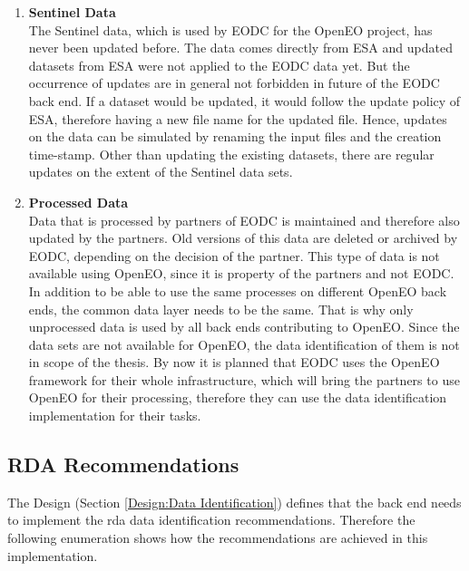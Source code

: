 \documentclass[draft,final]{vutinfth} %
\begin{document}
\begin{enumerate}
	\item \textbf{Sentinel Data} \\
	The Sentinel data, which is used by EODC for the OpenEO project, has never been updated before. The data comes directly from ESA and updated datasets from ESA were not applied to the EODC data yet. But the occurrence of updates are in general not forbidden in future of the EODC back end. If a dataset would be updated, it would follow the update policy of ESA, therefore having a new file name for the updated file. Hence, updates on the data can be simulated by renaming the input files and the creation time-stamp. Other than updating the existing datasets, there are regular updates on the extent of the Sentinel data sets.  
	\item \textbf{Processed Data} \\
	Data that is processed by partners of EODC is maintained and therefore also updated by the partners. Old versions of this data are deleted or archived by EODC, depending on the decision of the partner. This type of data is not available using OpenEO, since it is property of the partners and not EODC. In addition to be able to use the same processes on different OpenEO back ends, the common data layer needs to be the same. That is why only unprocessed data is used by all back ends contributing to OpenEO. Since the data sets are not available for OpenEO, the data identification of them is not in scope of the thesis. By now it is planned that EODC uses the OpenEO framework for their whole infrastructure, which will bring the partners to use OpenEO for their processing, therefore they can use the data identification implementation for their tasks.
\end{enumerate}


\subsection{RDA Recommendations}\label{Evaluation:dataidentification}
The Design (Section \ref{Design:Data Identification}) defines that the back end needs to implement the \acrshort{rda} data identification recommendations. Therefore the following enumeration shows how the recommendations are achieved in this implementation. 
\end{document}
